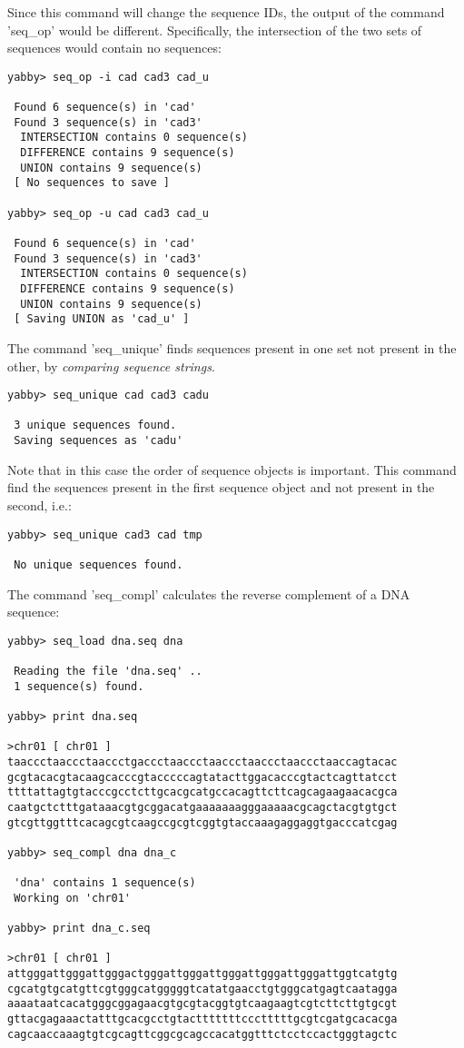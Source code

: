 Since this command will change the sequence IDs, the output
of the command 'seq\_op' would be different. Specifically,
the intersection of the two sets of sequences would contain
no sequences:

\begin{verbatim}
yabby> seq_op -i cad cad3 cad_u

 Found 6 sequence(s) in 'cad'
 Found 3 sequence(s) in 'cad3'
  INTERSECTION contains 0 sequence(s)
  DIFFERENCE contains 9 sequence(s)
  UNION contains 9 sequence(s)
 [ No sequences to save ]

yabby> seq_op -u cad cad3 cad_u

 Found 6 sequence(s) in 'cad'
 Found 3 sequence(s) in 'cad3'
  INTERSECTION contains 0 sequence(s)
  DIFFERENCE contains 9 sequence(s)
  UNION contains 9 sequence(s)
 [ Saving UNION as 'cad_u' ]
\end{verbatim}


The command 'seq\_unique' finds sequences present in one set
not present in the other, by {\em comparing sequence strings}.

\begin{verbatim}
yabby> seq_unique cad cad3 cadu

 3 unique sequences found.
 Saving sequences as 'cadu'
\end{verbatim}

Note that in this case the order of sequence objects is important.
This command find the sequences present in the first sequence
object and not present in the second, i.e.:

\begin{verbatim}
yabby> seq_unique cad3 cad tmp

 No unique sequences found.
\end{verbatim}


The command 'seq\_compl' calculates the reverse complement of
a DNA sequence:

\begin{verbatim}
yabby> seq_load dna.seq dna

 Reading the file 'dna.seq' ..
 1 sequence(s) found.

yabby> print dna.seq

>chr01 [ chr01 ]
taaccctaaccctaaccctgaccctaaccctaaccctaaccctaaccctaaccagtacac
gcgtacacgtacaagcacccgtacccccagtatacttggacacccgtactcagttatcct
ttttattagtgtacccgcctcttgcacgcatgccacagttcttcagcagaagaacacgca
caatgctctttgataaacgtgcggacatgaaaaaaagggaaaaacgcagctacgtgtgct
gtcgttggtttcacagcgtcaagccgcgtcggtgtaccaaagaggaggtgacccatcgag

yabby> seq_compl dna dna_c

 'dna' contains 1 sequence(s)
 Working on 'chr01'

yabby> print dna_c.seq

>chr01 [ chr01 ]
attgggattgggattgggactgggattgggattgggattgggattgggattggtcatgtg
cgcatgtgcatgttcgtgggcatgggggtcatatgaacctgtgggcatgagtcaatagga
aaaataatcacatgggcggagaacgtgcgtacggtgtcaagaagtcgtcttcttgtgcgt
gttacgagaaactatttgcacgcctgtactttttttccctttttgcgtcgatgcacacga
cagcaaccaaagtgtcgcagttcggcgcagccacatggtttctcctccactgggtagctc
\end{verbatim}


